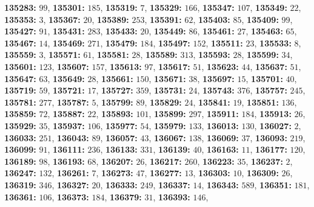 \textsf{\bfseries 135283:} $99$, \textsf{\bfseries 135301:} $185$, \textsf{\bfseries 135319:} $7$, \textsf{\bfseries 135329:} $166$, \textsf{\bfseries 135347:} $107$, \textsf{\bfseries 135349:} $22$, \textsf{\bfseries 135353:} $3$, \textsf{\bfseries 135367:} $20$, \textsf{\bfseries 135389:} $253$, \textsf{\bfseries 135391:} $62$, \textsf{\bfseries 135403:} $85$, \textsf{\bfseries 135409:} $99$, \textsf{\bfseries 135427:} $91$, \textsf{\bfseries 135431:} $283$, \textsf{\bfseries 135433:} $20$, \textsf{\bfseries 135449:} $86$, \textsf{\bfseries 135461:} $27$, \textsf{\bfseries 135463:} $65$, \textsf{\bfseries 135467:} $14$, \textsf{\bfseries 135469:} $271$, \textsf{\bfseries 135479:} $184$, \textsf{\bfseries 135497:} $152$, \textsf{\bfseries 135511:} $23$, \textsf{\bfseries 135533:} $8$, \textsf{\bfseries 135559:} $3$, \textsf{\bfseries 135571:} $61$, \textsf{\bfseries 135581:} $28$, \textsf{\bfseries 135589:} $313$, \textsf{\bfseries 135593:} $28$, \textsf{\bfseries 135599:} $34$, \textsf{\bfseries 135601:} $123$, \textsf{\bfseries 135607:} $157$, \textsf{\bfseries 135613:} $97$, \textsf{\bfseries 135617:} $51$, \textsf{\bfseries 135623:} $44$, \textsf{\bfseries 135637:} $51$, \textsf{\bfseries 135647:} $63$, \textsf{\bfseries 135649:} $28$, \textsf{\bfseries 135661:} $150$, \textsf{\bfseries 135671:} $38$, \textsf{\bfseries 135697:} $15$, \textsf{\bfseries 135701:} $40$, \textsf{\bfseries 135719:} $59$, \textsf{\bfseries 135721:} $17$, \textsf{\bfseries 135727:} $359$, \textsf{\bfseries 135731:} $24$, \textsf{\bfseries 135743:} $376$, \textsf{\bfseries 135757:} $245$, \textsf{\bfseries 135781:} $277$, \textsf{\bfseries 135787:} $5$, \textsf{\bfseries 135799:} $89$, \textsf{\bfseries 135829:} $24$, \textsf{\bfseries 135841:} $19$, \textsf{\bfseries 135851:} $136$, \textsf{\bfseries 135859:} $72$, \textsf{\bfseries 135887:} $22$, \textsf{\bfseries 135893:} $101$, \textsf{\bfseries 135899:} $297$, \textsf{\bfseries 135911:} $184$, \textsf{\bfseries 135913:} $26$, \textsf{\bfseries 135929:} $35$, \textsf{\bfseries 135937:} $106$, \textsf{\bfseries 135977:} $54$, \textsf{\bfseries 135979:} $133$, \textsf{\bfseries 136013:} $130$, \textsf{\bfseries 136027:} $2$, \textsf{\bfseries 136033:} $251$, \textsf{\bfseries 136043:} $89$, \textsf{\bfseries 136057:} $43$, \textsf{\bfseries 136067:} $138$, \textsf{\bfseries 136069:} $37$, \textsf{\bfseries 136093:} $219$, \textsf{\bfseries 136099:} $91$, \textsf{\bfseries 136111:} $236$, \textsf{\bfseries 136133:} $331$, \textsf{\bfseries 136139:} $40$, \textsf{\bfseries 136163:} $11$, \textsf{\bfseries 136177:} $120$, \textsf{\bfseries 136189:} $98$, \textsf{\bfseries 136193:} $68$, \textsf{\bfseries 136207:} $26$, \textsf{\bfseries 136217:} $260$, \textsf{\bfseries 136223:} $35$, \textsf{\bfseries 136237:} $2$, \textsf{\bfseries 136247:} $132$, \textsf{\bfseries 136261:} $7$, \textsf{\bfseries 136273:} $47$, \textsf{\bfseries 136277:} $13$, \textsf{\bfseries 136303:} $10$, \textsf{\bfseries 136309:} $26$, \textsf{\bfseries 136319:} $346$, \textsf{\bfseries 136327:} $20$, \textsf{\bfseries 136333:} $249$, \textsf{\bfseries 136337:} $14$, \textsf{\bfseries 136343:} $589$, \textsf{\bfseries 136351:} $181$, \textsf{\bfseries 136361:} $106$, \textsf{\bfseries 136373:} $184$, \textsf{\bfseries 136379:} $31$, \textsf{\bfseries 136393:} $146$, 
